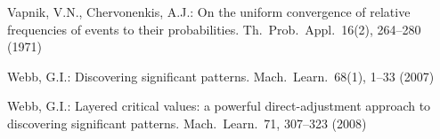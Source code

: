 \begin{thebibliography}{33}
\iffalse
\bibitem[{Teytaud and Lallich(2001)}]{TeytaudL01}
Teytaud, O., Lallich, S.: Contribution of statistical learning to validation of
  association rules (2001)%
 \fi

Vapnik, V.N., Chervonenkis, A.J.: On the uniform convergence of relative
  frequencies of events to their probabilities.
\newblock Th.~Prob.~Appl.~16(2), 264--280 (1971)

Webb, G.I.: Discovering significant patterns.
\newblock Mach.~Learn.~68(1), 1--33 (2007)

Webb, G.I.: Layered critical values: a powerful direct-adjustment approach to
  discovering significant patterns.
\newblock Mach.~Learn.~71, 307--323 (2008)

\end{thebibliography}


